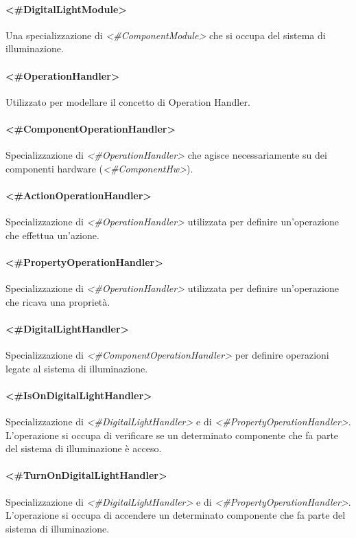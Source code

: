 \paragraph{<\#DigitalLightModule>}
Una specializzazione di \textit{<\#ComponentModule>} che si occupa del sistema di illuminazione.
\paragraph{<\#OperationHandler>}
Utilizzato per modellare il concetto di Operation Handler.
\paragraph{<\#ComponentOperationHandler>}
Specializzazione di \textit{<\#OperationHandler>} che agisce necessariamente su dei componenti hardware (\textit{<\#ComponentHw>}).
\paragraph{<\#ActionOperationHandler>}
Specializzazione di \textit{<\#OperationHandler>} utilizzata per definire un'operazione che effettua un'azione.
\paragraph{<\#PropertyOperationHandler>}
Specializzazione di \textit{<\#OperationHandler>} utilizzata per definire un'operazione che ricava una proprietà.
\paragraph{<\#DigitalLightHandler>}
Specializzazione di \textit{<\#ComponentOperationHandler>} per definire operazioni legate al sistema di illuminazione.
\paragraph{<\#IsOnDigitalLightHandler>}
Specializzazione di \textit{<\#DigitalLightHandler>} e di \textit{<\#PropertyOperationHandler>}. L'operazione si occupa di verificare se un determinato componente che fa parte del sistema di illuminazione è acceso.
\paragraph{<\#TurnOnDigitalLightHandler>}
Specializzazione di \textit{<\#DigitalLightHandler>} e di \textit{<\#PropertyOperationHandler>}. L'operazione si occupa di accendere un determinato componente che fa parte del sistema di illuminazione.
